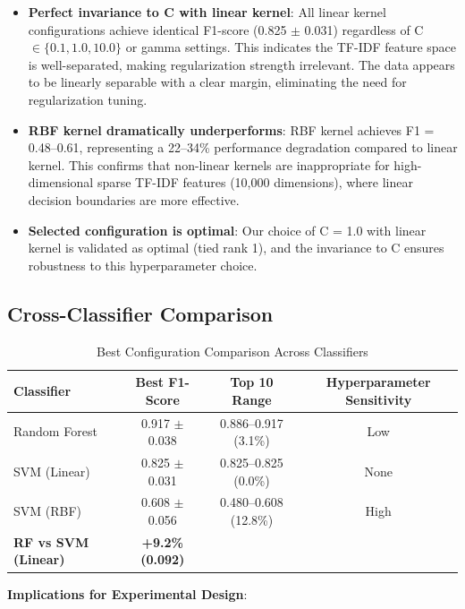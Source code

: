 \begin{itemize}
    \item \textbf{Perfect invariance to C with linear kernel}: All linear kernel configurations achieve identical F1-score (0.825 $\pm$ 0.031) regardless of C $\in \{0.1, 1.0, 10.0\}$ or gamma settings. This indicates the TF-IDF feature space is well-separated, making regularization strength irrelevant. The data appears to be linearly separable with a clear margin, eliminating the need for regularization tuning.

    \item \textbf{RBF kernel dramatically underperforms}: RBF kernel achieves F1 = 0.48--0.61, representing a 22--34\% performance degradation compared to linear kernel. This confirms that non-linear kernels are inappropriate for high-dimensional sparse TF-IDF features (10,000 dimensions), where linear decision boundaries are more effective.

    \item \textbf{Selected configuration is optimal}: Our choice of C = 1.0 with linear kernel is validated as optimal (tied rank 1), and the invariance to C ensures robustness to this hyperparameter choice.
\end{itemize}

\subsection{Cross-Classifier Comparison}

\begin{table}[h]
\centering
\caption{Best Configuration Comparison Across Classifiers}
\label{tab:classifier_comparison_grid_search}
\begin{tabular}{lccc}
\toprule
\textbf{Classifier} & \textbf{Best F1-Score} & \textbf{Top 10 Range} & \textbf{Hyperparameter Sensitivity} \\
\midrule
Random Forest & 0.917 $\pm$ 0.038 & 0.886--0.917 (3.1\%) & Low \\
SVM (Linear) & 0.825 $\pm$ 0.031 & 0.825--0.825 (0.0\%) & None \\
SVM (RBF) & 0.608 $\pm$ 0.056 & 0.480--0.608 (12.8\%) & High \\
\midrule
\textbf{RF vs SVM (Linear)} & \textbf{+9.2\% (0.092)} & & \\
\bottomrule
\end{tabular}
\end{table}

\textbf{Implications for Experimental Design}:

